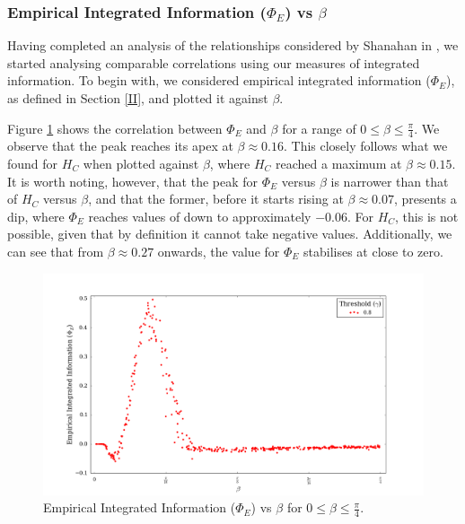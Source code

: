 \documentclass[a4paper,11pt]{article}
\begin{document}
\subsubsection{Empirical Integrated Information ($\Phi_{E}$) vs $\beta$}
\label{sec:app:osc:res:phi-v-beta}

Having completed an analysis of the relationships considered by Shanahan in \cite{Shanahan2010}, we started analysing comparable correlations using our measures of integrated information. To begin with, we considered empirical integrated information ($\Phi_{E}$), as defined in Section \ref{II}, and plotted it against $\beta$.

Figure \ref{fig:phi-vs-beta-orig} shows the correlation between $\Phi_{E}$ and $\beta$ for a range of $0 \leq \beta \leq \frac{\pi}{4}$. We observe that the peak reaches its apex at $\beta \approx 0.16$. This closely follows what we found for $H_C$ when plotted against $\beta$, where $H_C$ reached a maximum at $\beta \approx 0.15$. It is worth noting, however, that the peak for $\Phi_{E}$ versus $\beta$ is narrower than that of $H_C$ versus $\beta$, and that the former, before it starts rising at $\beta \approx 0.07$, presents a dip, where $\Phi_{E}$ reaches values of down to approximately $-0.06$. For $H_C$, this is not possible, given that by definition it cannot take negative values. Additionally, we can see that from $\beta \approx 0.27$ onwards, the value for $\Phi_{E}$ stabilises at close to zero. 

\begin{figure}[H]
\begin{center}
\includegraphics[scale = 0.35]{figures/phi_vs_beta_orig}
\caption{
	Empirical Integrated Information ($\Phi_E$) vs $\beta$ for $0 \leq \beta \leq \frac{\pi}{4}$.
	\label{fig:phi-vs-beta-orig}
}
\end{center}
\end{figure}
\end{document}
